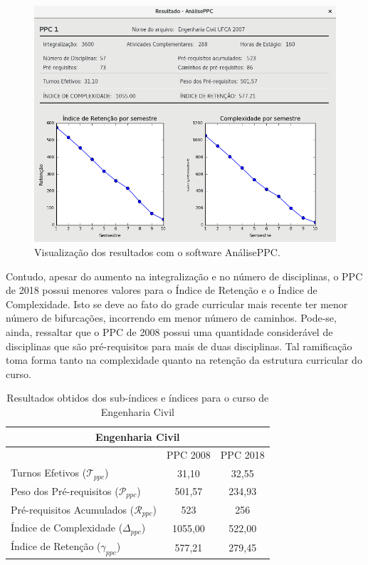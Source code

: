 \documentclass[a4paper, 12pt]{article}
\begin{document}
\begin{figure}[htb!]
\centering
\includegraphics[scale=0.45]{civil-window}
\caption{Visualização dos resultados com o software AnálisePPC.}
\label{img:civil-window}
\end{figure}

Contudo, apesar do aumento na integralização e no número de disciplinas, o PPC de 2018 \cite{eng-civil2018} possui menores valores para o Índice de Retenção e o Índice de 
Complexidade. Isto se deve ao fato do grade curricular mais recente ter menor número de bifurcações, incorrendo em menor número de caminhos. Pode-se, ainda, 
ressaltar que o PPC de 2008 \cite{eng-civil2008} possui uma quantidade considerável de disciplinas que são pré-requisitos para mais de duas disciplinas. Tal ramificação toma 
forma tanto na complexidade quanto na retenção da estrutura curricular do curso. 

\vfill

\begin{center}
\begin{table}
\centering
\begin{tabular}{|l|c|c|}
\hline
\multicolumn{3}{|c|}{Engenharia Civil} \\ 
\hline\hline
	& PPC 2008 & PPC 2018 \\
\hline
Turnos Efetivos ($\mathcal{T}_{ppc}$) & 31,10 & 32,55 \\
\hline
Peso dos Pré-requisitos ($\mathcal{P}_{ppc}$) & 501,57 & 234,93 \\
\hline
Pré-requisitos Acumulados ($\mathcal{R}_{ppc}$) & 523 & 256 \\
\hline
Índice de Complexidade ($\Delta_{ppc}$) & 1055,00 & 522,00 \\
\hline
Índice de Retenção ($\gamma_{ppc}$) & 577,21 & 279,45 \\ 
\hline
\end{tabular}
\caption{Resultados obtidos dos sub-índices e índices para o curso de Engenharia Civil}
\end{table}
\end{center}
\end{document}
